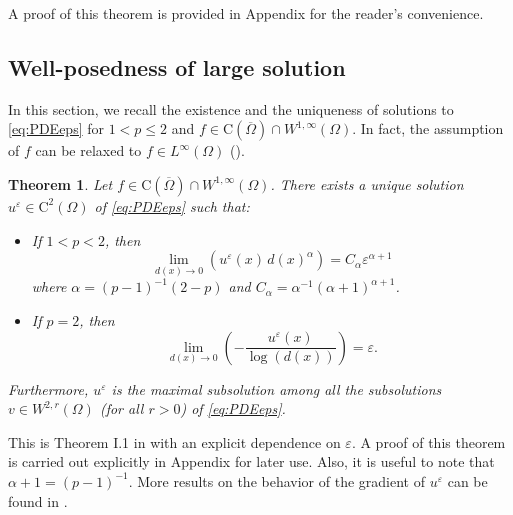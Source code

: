 \documentclass[12pt,reqno]{amsart}
\numberwithin{figure}{section}
\theoremstyle{plain}
\newtheorem{thm}{Theorem}[section]
\theoremstyle{remark}
\numberwithin{equation}{section}
\begin{document}
\noindent A proof of this theorem is provided in Appendix for the reader's convenience.




\subsection{Well-posedness of large solution} In this section, we recall the existence and the uniqueness of solutions to \eqref{eq:PDEeps} for $1<p\leq 2$ and $f\in \mathrm{C}(\overline{\Omega})\cap W^{1,\infty}(\Omega)$. In fact, the assumption of $f$ can be relaxed to $f\in L^\infty(\Omega)$ (\cite{Lasry1989}).

\begin{thm}\label{thm:wellposed1<p<2} Let $f\in \mathrm{C}(\overline{\Omega})\cap W^{1,\infty}(\Omega)$. There exists a unique solution $u^\varepsilon\in \mathrm{C}^2(\Omega)$ of \eqref{eq:PDEeps} such that:
\begin{itemize}
    \item[(i)] If $1<p< 2$, then 
\begin{equation}\label{rate_p<2}
    \lim_{d(x)\to 0}\left( u^\varepsilon(x) \,d(x)^\alpha \right)= C_\alpha \varepsilon^{\alpha+1}
\end{equation}
where $\alpha = (p-1)^{-1}(2-p)$ and $C_\alpha = \alpha^{-1}(\alpha+1)^{\alpha+1}$.
\item[(ii)] If $p=2$, then
\begin{equation}\label{rate_p=2}
    \lim_{d(x)\to 0} \left(-\frac{u^\varepsilon(x)}{\log(d(x))}\right) = \varepsilon.
\end{equation}
\end{itemize}
Furthermore, $u^\varepsilon$ is the maximal subsolution among all the subsolutions $v\in W^{2,r}(\Omega)$ (for all $r>0$) of \eqref{eq:PDEeps}.
\end{thm}
\noindent This is Theorem I.1 in \cite{Lasry1989} with an explicit dependence on $\varepsilon$. A proof of this theorem is carried out explicitly in Appendix for later use. Also, it is useful to note that $\alpha+1 = (p-1)^{-1}$. More results on the behavior of the gradient of $u^\varepsilon$ can be found in \cite{alessio_asymptotic_2006}.  
\end{document}
